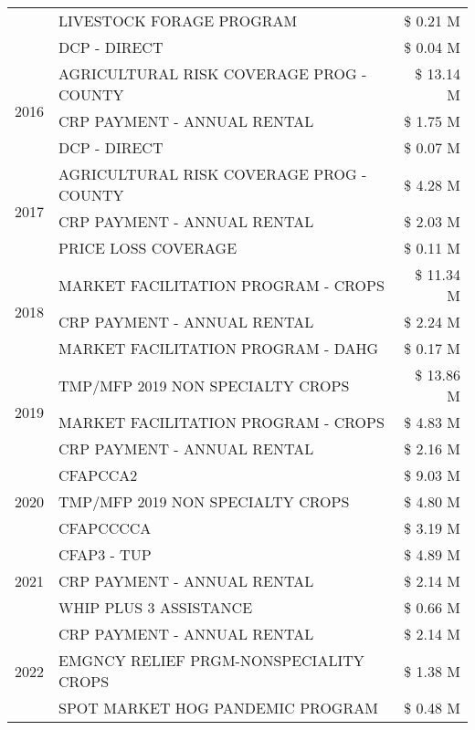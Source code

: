 \begin{tabular}{llr}
 & LIVESTOCK FORAGE PROGRAM & \$ 0.21 M \\
 & DCP - DIRECT & \$ 0.04 M \\
\cline{1-3}
\multirow[t]{3}{*}{2016} & AGRICULTURAL RISK COVERAGE PROG - COUNTY & \$ 13.14 M \\
 & CRP PAYMENT - ANNUAL RENTAL & \$ 1.75 M \\
 & DCP - DIRECT & \$ 0.07 M \\
\cline{1-3}
\multirow[t]{3}{*}{2017} & AGRICULTURAL RISK COVERAGE PROG - COUNTY & \$ 4.28 M \\
 & CRP PAYMENT - ANNUAL RENTAL & \$ 2.03 M \\
 & PRICE LOSS COVERAGE & \$ 0.11 M \\
\cline{1-3}
\multirow[t]{3}{*}{2018} & MARKET FACILITATION PROGRAM - CROPS & \$ 11.34 M \\
 & CRP PAYMENT - ANNUAL RENTAL & \$ 2.24 M \\
 & MARKET FACILITATION PROGRAM - DAHG & \$ 0.17 M \\
\cline{1-3}
\multirow[t]{3}{*}{2019} & TMP/MFP 2019 NON SPECIALTY CROPS & \$ 13.86 M \\
 & MARKET FACILITATION PROGRAM - CROPS & \$ 4.83 M \\
 & CRP PAYMENT - ANNUAL RENTAL & \$ 2.16 M \\
\cline{1-3}
\multirow[t]{3}{*}{2020} & CFAPCCA2 & \$ 9.03 M \\
 & TMP/MFP 2019 NON SPECIALTY CROPS & \$ 4.80 M \\
 & CFAPCCCCA & \$ 3.19 M \\
\cline{1-3}
\multirow[t]{3}{*}{2021} & CFAP3 - TUP & \$ 4.89 M \\
 & CRP PAYMENT - ANNUAL RENTAL & \$ 2.14 M \\
 & WHIP PLUS 3 ASSISTANCE & \$ 0.66 M \\
\cline{1-3}
\multirow[t]{3}{*}{2022} & CRP PAYMENT - ANNUAL RENTAL & \$ 2.14 M \\
 & EMGNCY RELIEF PRGM-NONSPECIALITY CROPS & \$ 1.38 M \\
 & SPOT MARKET HOG PANDEMIC PROGRAM & \$ 0.48 M \\
\cline{1-3}
\bottomrule
\end{tabular}
